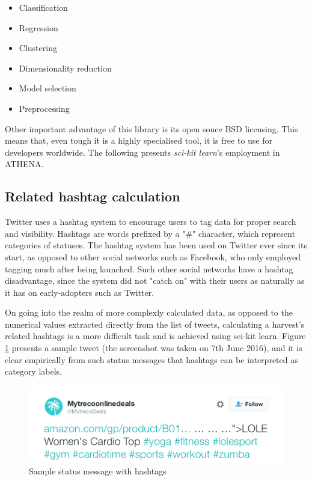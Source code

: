 \documentclass[12pt,a4paper,twoside]{report}
\begin{document}
\begin{itemize}
\item Classification
\item Regression
\item Clustering
\item Dimensionality reduction
\item Model selection
\item Preprocessing
\end{itemize}

Other important advantage of this library is its open souce BSD licensing. This means that, even tough it is a highly specialised tool, it is free to use for developers worldwide. The following presents \emph{sci-kit learn}'s employment in ATHENA.

\subsection{Related hashtag calculation}
Twitter uses a hashtag system to encourage users to tag data for proper search and visibility. Hashtags are words prefixed by a "\#" character, which represent categories of statuses. The hashtag system has been used on Twitter ever since its start, as opposed to other social networks such as Facebook, who only employed tagging much after being launched. Such other social networks have a hashtag disadvantage, since the system did not "catch on" with their users as naturally as it has on early-adopters such as Twitter.

On going into the realm of more complexly calculated data, as opposed to the numerical values extracted directly from the list of tweets, calculating a harvest's related hashtags is a more difficult task and is achieved using sci-kit learn. Figure \ref{fig:tweet} presents a sample tweet (the screenshot was taken on 7th June 2016), and it is clear empirically from such status messages that hashtags can be interpreted as category labels.

\begin{figure}[ht]
    \centering
\includegraphics[width=0.8\columnwidth]{img/tweet.png}
    \caption{Sample status message with hashtags}
    \label{fig:tweet}
\end{figure}
\end{document}
